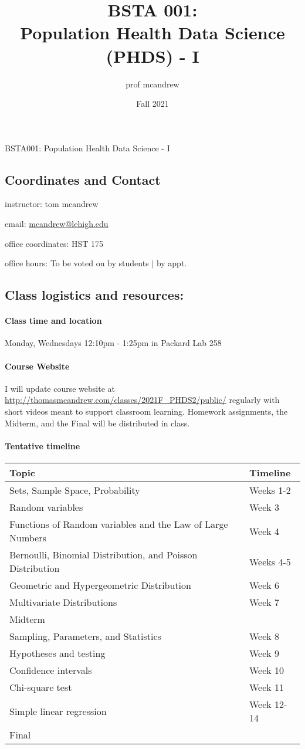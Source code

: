\documentclass[11pt]{article}
\title{BSTA 001:\\Population Health Data Science (PHDS) - I}
\author{prof mcandrew}
\date{Fall 2021}
\newcommand{\sub}[1]{
\hrulefill
\vspace{-5mm}
\subsection*{#1}
\vspace{-5mm}
\hrulefill
\vspace{-2.5mm}
}
\begin{document}
\begin{center}
{\large BSTA001: Population Health Data Science - I}
\end{center}


\sub{Coordinates and Contact} 
\vspace{1mm}

instructor: tom mcandrew

email: \url{mcandrew@lehigh.edu}

office coordinates: HST 175

office hours: To be voted on by students $\vert$ by appt.

\sub{Class logistics and resources:} 


\paragraph{Class time and location} \mbox{}
Monday, Wednesdays 12:10pm - 1:25pm  in Packard Lab 258 

\paragraph{Course Website} 
I will update course website at \url{http://thomasmcandrew.com/classes/2021F_PHDS2/public/} regularly with short videos meant to support classroom learning.
Homework assignments, the Midterm, and the Final will be distributed in class.

\paragraph{Tentative timeline}
\hspace{1mm}
\begin{table}[ht!]
    \centering
    \begin{tabular}{ll}
        \hline
        Topic & Timeline\\
        \hline
        Sets, Sample Space, Probability \dotfill & Weeks 1-2  \\
        Random variables \dotfill & Week 3\\
        Functions of Random variables and the Law of Large Numbers \dotfill & Week 4\\
        Bernoulli, Binomial Distribution, and Poisson Distribution \dotfill &Weeks 4-5\\
        Geometric and Hypergeometric Distribution\dotfill &Week 6\\
        Multivariate Distributions\dotfill &Week 7\\
        Midterm \dotfill\\
        Sampling, Parameters, and Statistics\dotfill &Week 8\\
        Hypotheses and testing\dotfill &Week 9\\
        Confidence intervals \dotfill &Week 10\\
        Chi-square test\dotfill &Week 11\\
        Simple linear regression\dotfill &Week 12-14\\
        Final \dotfill\\
        \hline
    \end{tabular}
\end{table}
    
\end{document}
